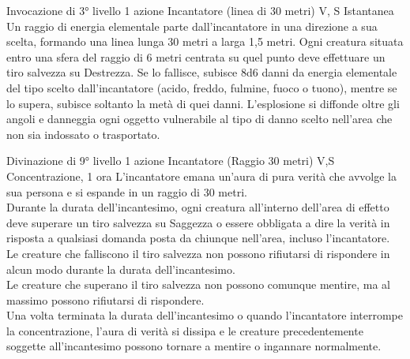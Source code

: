 {Invocazione di 3° livello}
{1 azione}
{Incantatore (linea di 30 metri)}
{V, S}
{Istantanea}
Un raggio di energia elementale parte dall'incantatore in una direzione a sua scelta, formando una linea lunga 30 metri a larga 1,5 metri. Ogni creatura situata entro una sfera del raggio di 6 metri centrata su quel punto deve effettuare un tiro salvezza su Destrezza. Se lo fallisce, subisce 8d6 danni da  energia elementale del tipo scelto dall'incantatore (acido, freddo, fulmine, fuoco o tuono), mentre se lo supera, subisce soltanto la metà di quei danni. 
L'esplosione si diffonde oltre gli angoli e danneggia ogni oggetto vulnerabile al tipo di danno scelto nell'area che non sia indossato o trasportato.

{Divinazione di 9° livello}
{1 azione}
{Incantatore (Raggio 30 metri)}
{V,S}
{Concentrazione, 1 ora}
L'incantatore emana un'aura di pura verità che avvolge la sua persona e si espande in un raggio di 30 metri. \\ Durante la durata dell'incantesimo, ogni creatura all'interno dell'area di effetto deve superare un tiro salvezza su Saggezza o essere obbligata a dire la verità in risposta a qualsiasi domanda posta da chiunque nell'area, incluso l'incantatore. \\ Le creature che falliscono il tiro salvezza non possono rifiutarsi di rispondere in alcun modo durante la durata dell'incantesimo.\\ Le creature che superano il tiro salvezza non possono comunque mentire, ma al massimo possono rifiutarsi di rispondere. \\ Una volta terminata la durata dell'incantesimo o quando l'incantatore interrompe la concentrazione, l'aura di verità si dissipa e le creature precedentemente soggette all'incantesimo possono tornare a mentire o ingannare normalmente.
